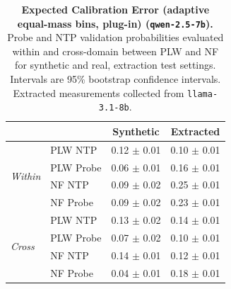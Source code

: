 \begin{table}[ht]
\centering
\begin{tabular}{ll cc}
\toprule
& & Synthetic & Extracted \\
\midrule
\multirow{4}{*}{\textit{Within}}
& PLW NTP & 0.12 $\pm$ 0.01 & 0.10 $\pm$ 0.01 \\
& PLW Probe & 0.06 $\pm$ 0.01 & 0.16 $\pm$ 0.01 \\
& NF NTP & 0.09 $\pm$ 0.02 & 0.25 $\pm$ 0.01 \\
& NF Probe & 0.09 $\pm$ 0.02 & 0.23 $\pm$ 0.01 \\
\midrule
\multirow{4}{*}{\textit{Cross}}
& PLW NTP & 0.13 $\pm$ 0.02 & 0.14 $\pm$ 0.01 \\
& PLW Probe & 0.07 $\pm$ 0.02 & 0.10 $\pm$ 0.01 \\
& NF NTP & 0.14 $\pm$ 0.01 & 0.12 $\pm$ 0.01 \\
& NF Probe & 0.04 $\pm$ 0.01 & 0.18 $\pm$ 0.01 \\
\bottomrule
\end{tabular}
\caption{\textbf{Expected Calibration Error (adaptive equal-mass bins, plug-in) (\texttt{qwen-2.5-7b}).} Probe and NTP validation probabilities evaluated within and cross-domain between PLW and NF for synthetic and real, extraction test settings. Intervals are 95\% bootstrap confidence intervals. Extracted measurements collected from \texttt{llama-3.1-8b}.}
\label{tab:qwen-2.5-7b-llama-3.1-8b-pond_nfix-ece_em}
\end{table}
